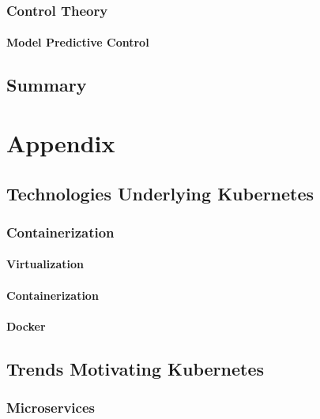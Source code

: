 \documentclass[twoside]{report}
\begin{document}
\subsection{Control Theory}

\subsubsection{Model Predictive Control}

\section{Summary}

\chapter{Appendix}

\section{Technologies Underlying Kubernetes}

\subsection{Containerization}

\subsubsection{Virtualization}

\subsubsection{Containerization}

\subsubsection{Docker}

\section{Trends Motivating Kubernetes}

\subsection{Microservices}



\end{document}
